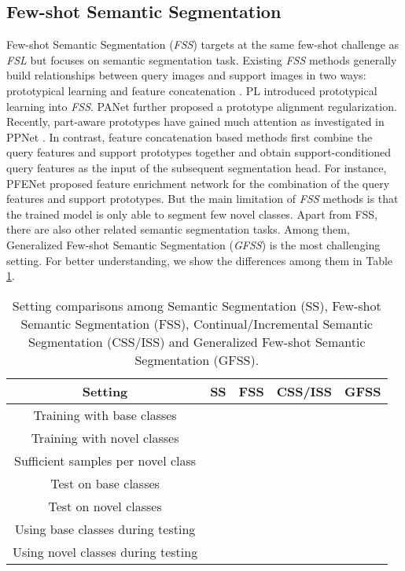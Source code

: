 \documentclass[journal]{IEEEtran}
\begin{document}
\subsection{Few-shot Semantic Segmentation}
Few-shot Semantic Segmentation (\textit{FSS}) targets at the same few-shot challenge as \textit{FSL} but focuses on semantic segmentation task.
Existing \textit{FSS} methods generally build relationships between query images and support images in two ways: prototypical learning \cite{dong2018few,liu2020part,wang2019panet} and feature concatenation \cite{cao2020few,yang2020prototype,zhang2019canet,tian2020prior}.
PL \cite{dong2018few} introduced prototypical learning \cite{snell2017prototypical} into \textit{FSS}.
PANet \cite{wang2019panet} further proposed a prototype alignment regularization.
Recently, part-aware prototypes have gained much attention as investigated in PPNet \cite{liu2020part}. 
In contrast, feature concatenation based methods first combine the query features and support prototypes together and obtain support-conditioned query features as the input of the subsequent segmentation head.
For instance, PFENet \cite{tian2020prior} proposed feature enrichment network for the combination of the query features and support prototypes.
But the main limitation of \textit{FSS} methods is that the trained model is only able to segment few novel classes.
Apart from FSS, there are also other related semantic segmentation tasks.
Among them, Generalized Few-shot Semantic Segmentation (\textit{GFSS}) is the most challenging setting.
For better understanding, we show the differences among them in Table \ref{tab:setting_com}.

\begin{table}[ht]
    \centering
    \caption{Setting comparisons among Semantic Segmentation (SS), Few-shot Semantic Segmentation (FSS), Continual/Incremental Semantic Segmentation (CSS/ISS) and Generalized Few-shot Semantic Segmentation (GFSS).}
\begin{tabular}{c|cccc}
    \hline
         Setting & SS & FSS & CSS/ISS & GFSS  \\
         \hline
         Training with base classes &  &  &  &  \\
         Training with novel classes &  &  &  &  \\
         Sufficient samples per novel class &  &  &  &  \\
         Test on base classes &  &  &  &  \\
         Test on novel classes &  &  &  &  \\
         Using base classes during testing &  &  &  &  \\
         Using novel classes during testing &  &  &  &  \\
    \hline
    \end{tabular}
    \label{tab:setting_com}
\end{table}
\end{document}
